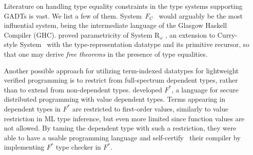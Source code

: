 Literature on handling type equality constraints in the type systems supporting
GADTs is vast. We list a few of them. System~$F_{\!C}$~\cite{Sulzmann07} would
arguably be the most influential system, being the intermediate language of
the Glasgow Haskell Compiler (GHC). \citet{VytWei10} proved parametricity of
System $\mathrm{R}_\omega$ \cite{Crary98}, an extension to Curry-style
System~\Fw
with the type-representation datatype and its primitive recursor, so that
one may derive \emph{free theorems} \cite{Wadler89free} in the presence of
type equalities.

Another possible approach for utilizing term-indexed datatypes for lightweight
verified programming is to restrict from full-spectrum dependent types, rather
than to extend from non-de\-pend\-ent types. \citet{Swamy11} developed $F^{*}$,
a language for secure distributed programming with value dependent types.
Terms appearing in dependent types in $F^{*}$ are restricted to first-order
values, similarly to value restriction in ML type inference, but even more
limited since function values are not allowed. By taming the dependent type
with such a restriction, they were able to have a usable programming language
and self-certify~\cite{Strub12} their compiler by implementing $F^{*}$
type checker in $F^{*}$.

